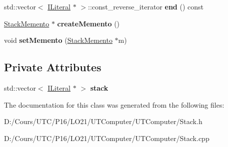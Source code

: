 \begin{DoxyCompactItemize}
\item 
std\+::vector$<$ \hyperlink{class_i_literal}{I\+Literal} $\ast$ $>$\+::const\+\_\+reverse\+\_\+iterator {\bfseries end} () const \hypertarget{class_stack_a95f0f58a1c0ea816844a942062f56eee}{}\label{class_stack_a95f0f58a1c0ea816844a942062f56eee}

\item 
\hyperlink{class_stack_memento}{Stack\+Memento} $\ast$ {\bfseries create\+Memento} ()\hypertarget{class_stack_aed9edaa5e9c5459adf3ce8de4e72c691}{}\label{class_stack_aed9edaa5e9c5459adf3ce8de4e72c691}

\item 
void {\bfseries set\+Memento} (\hyperlink{class_stack_memento}{Stack\+Memento} $\ast$m)\hypertarget{class_stack_a87a62dd4d17e4bcea98d782f1f6b0391}{}\label{class_stack_a87a62dd4d17e4bcea98d782f1f6b0391}

\end{DoxyCompactItemize}
\subsection*{Private Attributes}
\begin{DoxyCompactItemize}
\item 
std\+::vector$<$ \hyperlink{class_i_literal}{I\+Literal} $\ast$ $>$ {\bfseries stack}\hypertarget{class_stack_aaa534e772d217467440f4fad9466c5b3}{}\label{class_stack_aaa534e772d217467440f4fad9466c5b3}

\end{DoxyCompactItemize}


The documentation for this class was generated from the following files\+:\begin{DoxyCompactItemize}
\item 
D\+:/\+Cours/\+U\+T\+C/\+P16/\+L\+O21/\+U\+T\+Computer/\+U\+T\+Computer/Stack.\+h\item 
D\+:/\+Cours/\+U\+T\+C/\+P16/\+L\+O21/\+U\+T\+Computer/\+U\+T\+Computer/Stack.\+cpp\end{DoxyCompactItemize}
